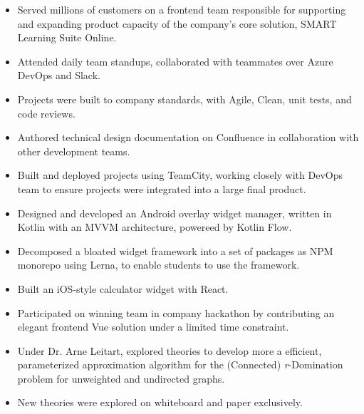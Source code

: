 \documentclass[11pt, a4paper]{article}
\begin{document}
\noindent
{
  \hfill
}
\vspace{-0.08in}
\begin{itemize}
  \item Served millions of customers on a frontend team responsible for supporting and expanding product capacity of the company's core solution, SMART Learning Suite Online.
        \vspace{-0.1in}
  \item Attended daily team standups, collaborated with teammates over Azure DevOps and Slack.
        \vspace{-0.1in}
  \item Projects were built to company standards, with Agile, Clean, unit tests, and code reviews.
        \vspace{-0.1in}
  \item Authored technical design documentation on Confluence in collaboration with other development teams.
        \vspace{-0.1in}
  \item Built and deployed projects using TeamCity, working closely with DevOps team to ensure projects were integrated into a large final product.
        \vspace{-0.1in}
  \item Designed and developed an Android overlay widget manager, written in Kotlin with an MVVM architecture, powereed by Kotlin Flow.
        \vspace{-0.1in}
  \item Decomposed a bloated widget framework into a set of packages as NPM monorepo using Lerna, to enable students to use the framework.
        \vspace{-0.1in}
  \item Built an iOS-style calculator widget with React.
        \vspace{-0.1in}
  \item Participated on winning team in company hackathon by contributing an elegant frontend Vue solution under a limited time constraint.
\end{itemize}
\vspace{-0.05in}

\noindent
{
  \hfill
}

\noindent
{
  \hfill
}
\vspace{-0.08in}
\begin{itemize}
  \item Under Dr. Arne Leitart, explored theories to develop more a efficient, parameterized
        approximation algorithm for the (Connected) {\it r}-Domination problem for unweighted
        and undirected graphs.
        \vspace{-0.1in}
  \item New theories were explored on whiteboard and paper exclusively.
\end{itemize}
\vspace{-0.05in}
\end{document}
